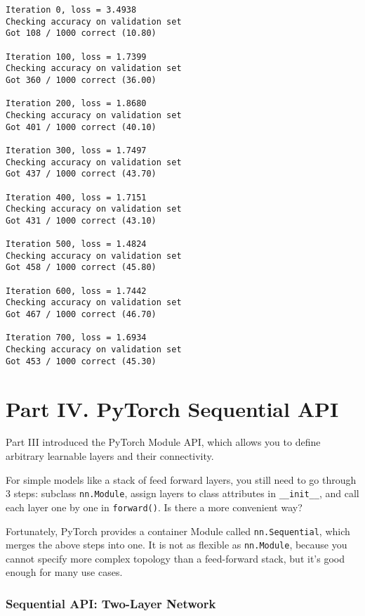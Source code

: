 \documentclass[11pt]{article}
\begin{document}
    \begin{Verbatim}[commandchars=\\\{\}]
Iteration 0, loss = 3.4938
Checking accuracy on validation set
Got 108 / 1000 correct (10.80)

Iteration 100, loss = 1.7399
Checking accuracy on validation set
Got 360 / 1000 correct (36.00)

Iteration 200, loss = 1.8680
Checking accuracy on validation set
Got 401 / 1000 correct (40.10)

Iteration 300, loss = 1.7497
Checking accuracy on validation set
Got 437 / 1000 correct (43.70)

Iteration 400, loss = 1.7151
Checking accuracy on validation set
Got 431 / 1000 correct (43.10)

Iteration 500, loss = 1.4824
Checking accuracy on validation set
Got 458 / 1000 correct (45.80)

Iteration 600, loss = 1.7442
Checking accuracy on validation set
Got 467 / 1000 correct (46.70)

Iteration 700, loss = 1.6934
Checking accuracy on validation set
Got 453 / 1000 correct (45.30)

    \end{Verbatim}

    \hypertarget{part-iv.-pytorch-sequential-api}{%
\section{Part IV. PyTorch Sequential
API}\label{part-iv.-pytorch-sequential-api}}

Part III introduced the PyTorch Module API, which allows you to define
arbitrary learnable layers and their connectivity.

For simple models like a stack of feed forward layers, you still need to
go through 3 steps: subclass \texttt{nn.Module}, assign layers to class
attributes in \texttt{\_\_init\_\_}, and call each layer one by one in
\texttt{forward()}. Is there a more convenient way?

Fortunately, PyTorch provides a container Module called
\texttt{nn.Sequential}, which merges the above steps into one. It is not
as flexible as \texttt{nn.Module}, because you cannot specify more
complex topology than a feed-forward stack, but it's good enough for
many use cases.

\hypertarget{sequential-api-two-layer-network}{%
\subsubsection{Sequential API: Two-Layer
Network}\label{sequential-api-two-layer-network}}
\end{document}

